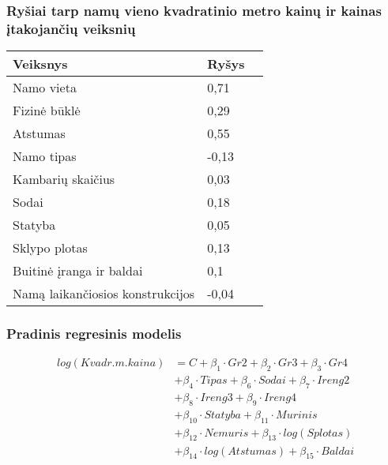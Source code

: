 \documentclass[utf8,hyperref={unicode}]{beamer}
\theoremstyle{change}\newtheorem{teorema}{Teiginys}
\theoremstyle{change}\newtheorem{salyga}{}
\begin{document}
\begin{frame}
    \frametitle{ Ryšiai tarp namų vieno kvadratinio metro kainų ir kainas įtakojančių veiksnių}
  \begin{table}[H]
        \begin{center}
        \begin{tabular}{ | p{} | l | l |}
       \hline
       \textbf{Veiksnys} & \textbf{Ryšys} \\ \hline
    Namo vieta & 0,71\\ \hline
    Fizinė būklė & 0,29 \\ \hline
    Atstumas & 0,55 \\ \hline
    Namo tipas & -0,13 \\ \hline
    Kambarių skaičius & 0,03 \\ \hline
    Sodai & 0,18 \\ \hline
    Statyba & 0,05 \\ \hline
    Sklypo plotas & 0,13 \\ \hline
    Buitinė įranga ir baldai & 0,1 \\ \hline
    Namą laikančiosios konstrukcijos & -0,04 \\ \hline
    \end{tabular}
\end{center}
\end{table} 
\end{frame}

\begin{frame}
    \frametitle{Pradinis regresinis modelis}   
\begin{align*}
log(Kvadr.m. kaina)&=C+\beta_1\cdot Gr2+\beta_2\cdot  Gr3+\beta_3\cdot Gr4\\&+\beta_4\cdot Tipas+\beta_6\cdot Sodai+\beta_7\cdot Ireng2\\&+\beta_8\cdot Ireng3+\beta_9\cdot Ireng4\\&+\beta_{10}\cdot Statyba+\beta_{11}\cdot Murinis\\&+
\beta_{12}\cdot Nemuris+\beta_{13}\cdot log(Splotas)\\&+ \beta_{14}\cdot log(Atstumas)+\beta_{15}\cdot Baldai
\end{align*}
\end{frame}
\end{document}
